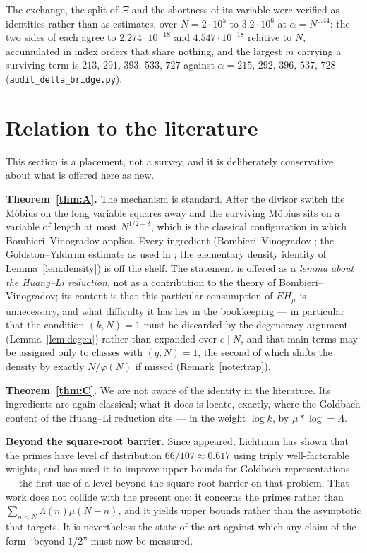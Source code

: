 \documentclass[11pt,a4paper]{article}
\theoremstyle{plain}
\theoremstyle{definition}
\theoremstyle{remark}
\begin{document}
The exchange, the split of $\Xi$ and the shortness of its variable were
verified as identities rather than as estimates, over
$N=2\cdot10^5$ to $3.2\cdot10^6$ at $\alpha=N^{0.44}$: the two sides of
each agree to $2.274\cdot10^{-18}$ and $4.547\cdot10^{-18}$ relative to
$N$, accumulated in index orders that share nothing, and the largest
$m$ carrying a surviving term is $213,\,291,\,393,\,533,\,727$ against
$\alpha=215,\,292,\,396,\,537,\,728$
(\texttt{audit\_delta\_bridge.py}).

\section{Relation to the literature}\label{sec:lit}

This section is a placement, not a survey, and it is deliberately
conservative about what is offered here as new.

\medskip\noindent
\textbf{Theorem~\ref{thm:A}.} The mechanism is standard. After the
divisor switch the M\"obius on the long variable squares away and the
surviving M\"obius sits on a variable of length at most
$N^{1/2-\delta}$, which is the classical configuration in which
Bombieri--Vinogradov applies. Every ingredient
(Bombieri--Vinogradov \cite{MoV}; the Goldston--Y{\i}ld{\i}r{\i}m
estimate \cite{GY} as used in \cite{HL}; the elementary density
identity of Lemma~\ref{lem:density}) is off the shelf. The statement
is offered as a \emph{lemma about the Huang--Li reduction}, not as a
contribution to the theory of Bombieri--Vinogradov; its content is
that this particular consumption of $EH_\mu$ is unnecessary, and what
difficulty it has lies in the bookkeeping --- in particular that the
condition $(k,N)=1$ must be discarded by the degeneracy argument
(Lemma~\ref{lem:degen}) rather than expanded over $e\mid N$, and that
main terms may be assigned only to classes with $(q,N)=1$, the second
of which shifts the density by exactly $N/\varphi(N)$ if missed
(Remark~\ref{note:trap}).

\medskip\noindent
\textbf{Theorem~\ref{thm:C}.} We are not aware of the identity in the
literature. Its ingredients are again classical; what it does is
locate, exactly, where the Goldbach content of the Huang--Li reduction
sits --- in the weight $\log k$, by $\mu*\log=\Lambda$.

\medskip\noindent
\textbf{Beyond the square-root barrier.} Since \cite{HL} appeared,
Lichtman \cite{Li23} has shown that the primes have level of
distribution $66/107\approx0.617$ using triply well-factorable
weights, and has used it to improve upper bounds for Goldbach
representations --- the first use of a level beyond the square-root
barrier on that problem. That work does not collide with the present
one: it concerns the primes rather than
$\sum_{n<N}\Lambda(n)\mu(N-n)$, and it yields upper bounds rather than
the asymptotic that \cite{HL} targets. It is nevertheless the state of
the art against which any claim of the form ``beyond $1/2$'' must now
be measured.
\end{document}
